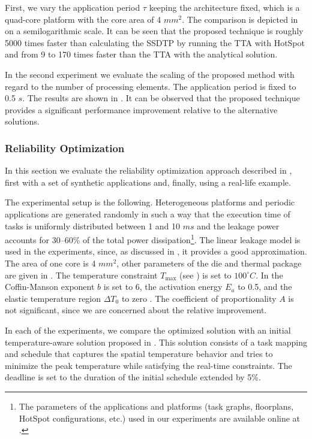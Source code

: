 First, we vary the application period $\tau$ keeping the architecture fixed,
which is a quad-core platform with the core area of 4 $mm^2$. The comparison is
depicted in  on a semilogarithmic scale. It can be seen that
the proposed technique is roughly 5000 times faster than calculating the SSDTP
by running the TTA with HotSpot and from 9 to 170 times faster than the TTA with
the analytical solution.

In the second experiment we evaluate the scaling of the proposed method with
regard to the number of processing elements. The application period is fixed to
0.5 $s$. The results are shown in . It can be observed that
the proposed technique provides a significant performance improvement relative
to the alternative solutions.

\subsubsection{Reliability Optimization} 

In this section we evaluate the reliability optimization approach described in
, first with a set of synthetic applications and, finally,
using a real-life example.

The experimental setup is the following. Heterogeneous platforms and periodic
applications are generated randomly \cite{dick1998} in such a way that the
execution time of tasks is uniformly distributed between 1 and 10 $ms$ and the
leakage power accounts for 30--60\% of the total power dissipation\footnote{The
parameters of the applications and platforms (task graphs, floorplans, HotSpot
configurations, etc.) used in our experiments are available online at
\cite{liu2011}.}. The linear leakage model is used in the experiments, since, as
discussed in , it provides a good approximation. The
area of one core is 4 $mm^2$, other parameters of the die and thermal package
are given in . The temperature constraint $T_\text{max}$ (see
) is set to $100^\circ C$. In  the
Coffin-Manson exponent $b$ is set to 6, the activation energy $E_a$ to 0.5, and
the elastic temperature region $\Delta T_0$ to zero \cite{jedec2010}. The
coefficient of proportionality $A$ is not significant, since we are concerned
about the relative improvement.

In each of the experiments, we compare the optimized solution with an initial
temperature-aware solution proposed in \cite{xie2006}. This solution consists of
a task mapping and schedule that captures the spatial temperature behavior and
tries to minimize the peak temperature while satisfying the real-time
constraints. The deadline is set to the duration of the initial schedule
extended by 5\%.

